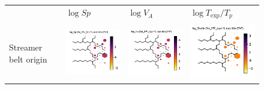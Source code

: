 \documentclass[utf8]{frontiersSCNS} %
\begin{document}
\begin{figure}[h!]\centering
	\begin{tabular}{m{2.5cm}CCC}
		& $\log Sp$ & $\log V_{A}$ & $\log T_{\text{exp}}/T_p$ \\ \\
		Streamer belt origin & \includegraphics[width=4.5cm]{Amaya/SWtype-Xu_SW_type-0-log_Sp} &
		\includegraphics[width=4.5cm]{Amaya/SWtype-Xu_SW_type-0-log_Va} &
		\includegraphics[width=4.5cm]{Amaya/SWtype-Xu_SW_type-0-log_Tratio} \hfill	\\
		

\end{tabular}
\end{figure}
\end{document}
